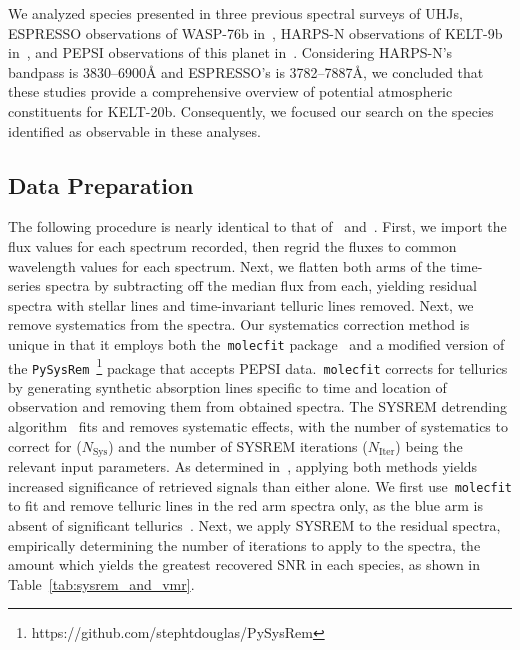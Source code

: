 \documentclass[twocolumn]{aastex631}
\newcommand{\code}[1]{\texttt{#1}}
\begin{document}
            We analyzed species presented in three previous spectral surveys of UHJs, ESPRESSO observations of WASP-76b in~\citet{Kesseli2022}, HARPS-N observations of KELT-9b in~\citet{Hoeijmakers2019}, and PEPSI observations of this planet in~\citet{Petz2023}. Considering HARPS-N's bandpass is 3830--6900\AA\~\citep{Cosentino2012} and ESPRESSO's is 3782--7887\AA\~\citep{Pepe2021}, we concluded that these studies provide a comprehensive overview of potential atmospheric constituents for KELT-20b. Consequently, we focused our search on the species identified as observable in these analyses.
            
        \subsection{Data Preparation}\label{subsec:Data Preparation}
            The following procedure is nearly identical to that of~\citep{Johnson2023} and~\citep{Petz2023}. First, we import the flux values for each spectrum recorded, then regrid the fluxes to common wavelength values for each spectrum. Next, we flatten both arms of the time-series spectra by subtracting off the median flux from each, yielding residual spectra with stellar lines and time-invariant telluric lines removed. Next, we remove systematics from the spectra. Our systematics correction method is unique in that it employs both the~\code{molecfit} package~\citep{Smette2015, Kausch2015} and a modified version of the \code{PySysRem}~\footnote{https://github.com/stephtdouglas/PySysRem} package that accepts PEPSI data.~\code{molecfit} corrects for tellurics by generating synthetic absorption lines specific to time and location of observation and removing them from obtained spectra. The SYSREM detrending algorithm~\citep{Tamuz2005} fits and removes systematic effects, with the number of systematics to correct for ($N_{\mathrm{Sys}}$) and the number of SYSREM iterations ($N_{\mathrm{Iter}}$) being the relevant input parameters. As determined in~\citet{Johnson2023}, applying both methods yields increased significance of retrieved signals than either alone. We first use~\code{molecfit} to fit and remove telluric lines in the red arm spectra only, as the blue arm is absent of significant tellurics~\citep{Smette2015}. Next, we apply SYSREM to the residual spectra, empirically determining the number of iterations to apply to the spectra, the amount which yields the greatest recovered SNR in each species, as shown in Table~\ref{tab:sysrem_and_vmr}.
\end{document}

